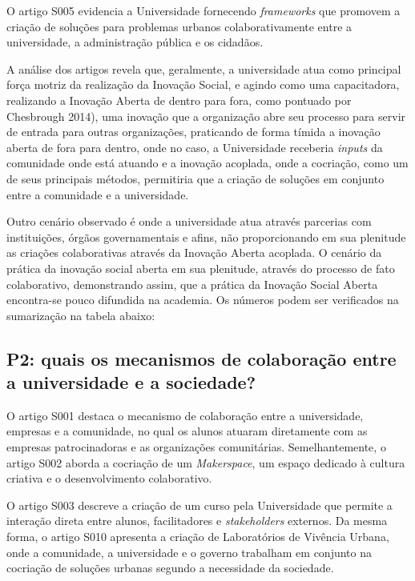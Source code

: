 O artigo S005 evidencia a Universidade fornecendo \textit{frameworks} que promovem a criação de soluções para problemas urbanos colaborativamente entre a universidade, a administração pública e os cidadãos.

A análise dos artigos revela que, geralmente, a universidade atua como principal força motriz da realização da Inovação Social, e agindo como uma capacitadora, realizando a Inovação Aberta de dentro para fora, como pontuado por Chesbrough 2014), uma inovação que a organização abre seu processo para servir de entrada para outras organizações, praticando de forma tímida a inovação aberta de fora para dentro, onde no caso, a Universidade receberia \textit{inputs} da comunidade onde está atuando e a inovação acoplada, onde a cocriação, como um de seus principais métodos, permitiria que a criação de soluções em conjunto entre a comunidade e a universidade. 

Outro cenário observado é onde a universidade atua através parcerias com instituições, órgãos governamentais e afins, não proporcionando em sua plenitude as criações colaborativas através da Inovação Aberta acoplada. O cenário da prática da inovação social aberta em sua plenitude, através do processo de fato colaborativo, demonstrando assim, que a prática da Inovação Social Aberta encontra-se pouco difundida na academia. Os números podem ser verificados na sumarização na tabela abaixo:



\subsection{P2: quais os mecanismos de colaboração entre a universidade e a sociedade?} \cite{brunswicker2018}

O artigo S001 destaca o mecanismo de colaboração entre a universidade, empresas e a comunidade, no qual os alunos atuaram diretamente com as empresas patrocinadoras e as organizações comunitárias. Semelhantemente, o artigo S002 aborda a cocriação de um \textit{Makerspace}, um espaço dedicado à cultura criativa e o desenvolvimento colaborativo. 

O artigo S003 descreve a criação de um curso pela Universidade que permite a interação direta entre alunos, facilitadores e \textit{stakeholders} externos. Da mesma forma, o artigo S010 apresenta a criação de Laboratórios de Vivência Urbana, onde a comunidade, a universidade e o governo trabalham em conjunto na cocriação de soluções urbanas segundo a necessidade da sociedade. 

